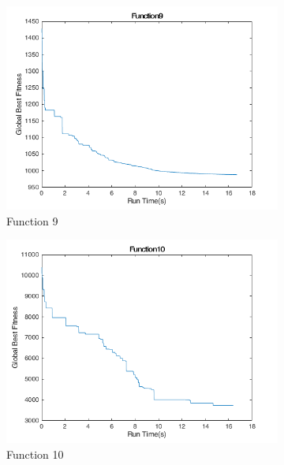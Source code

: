 \begin{figure}
  \begin{subfigure}[b]{0.4\textwidth}
    \includegraphics[width=\textwidth]{img/cecrt/f9}
    \caption{Function 9}
  \end{subfigure}
  \begin{subfigure}[b]{0.4\textwidth}
    \includegraphics[width=\textwidth]{img/cecrt/f10}
    \caption{Function 10}
  \end{subfigure}
  \begin{subfigure}[b]{0.4\textwidth}

\end{subfigure}
\end{figure}

